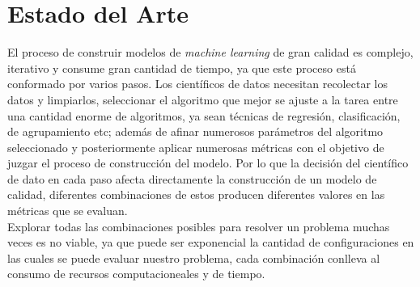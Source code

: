 \chapter{Estado del Arte}\label{chapter:state-of-the-art}

El proceso de construir modelos de \textit{machine learning} de gran calidad es complejo, iterativo y consume gran cantidad de tiempo, ya que este proceso está conformado por varios pasos. Los científicos de datos necesitan recolectar los datos y limpiarlos, seleccionar el algoritmo que mejor se ajuste a la tarea entre una cantidad enorme de algoritmos, ya sean técnicas de regresión, clasificación, de agrupamiento etc; además de afinar numerosos parámetros del algoritmo seleccionado y posteriormente aplicar numerosas métricas con el objetivo de juzgar el proceso de construcción del modelo. Por lo que la decisión del científico de dato en cada paso afecta directamente la construcción de un modelo de calidad, diferentes combinaciones de estos producen diferentes valores en las métricas que se evaluan. \\

Explorar todas las combinaciones posibles para resolver un problema muchas veces es no viable, ya que puede ser exponencial la cantidad de configuraciones en las cuales se puede evaluar nuestro problema, cada combinación conlleva al consumo de recursos computacioneales y de tiempo. \\

